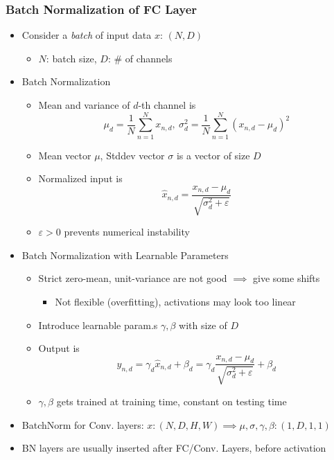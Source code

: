 \subsubsection*{Batch Normalization of FC Layer}
\begin{itemize}
    \item Consider a \textit{batch} of input data $x$: $(N,D)$
    \begin{itemize}
        \item $N$: batch size, $D$: \# of channels
    \end{itemize}
    \item Batch Normalization
    \begin{itemize}
        \item Mean and variance of $d$-th channel is
        \begin{equation}
            \mu_d=\frac{1}{N}\sum_{n=1}^Nx_{n,d},~\sigma_d^2=\frac{1}{N}\sum_{n=1}^N\left(x_{n,d}-\mu_d\right)^2
        \end{equation}
        \item Mean vector $\mu$, Stddev vector $\sigma$ is a vector of size $D$
        \item Normalized input is
        \begin{equation}
            \hat{x}_{n,d}=\frac{x_{n,d}-\mu_d}{\sqrt{\sigma_d^2+\varepsilon}}
        \end{equation}
        \item $\varepsilon>0$ prevents numerical instability
    \end{itemize}
    \item Batch Normalization with Learnable Parameters
    \begin{itemize}
        \item Strict zero-mean, unit-variance are not good $\implies$ give some shifts
        \begin{itemize}
            \item Not flexible (overfitting), activations may look too linear
        \end{itemize}
        \item Introduce learnable param.s $\gamma,\beta$ with size of $D$
        \item Output is
        \begin{equation}
            y_{n,d}=\gamma_d\hat{x}_{n,d}+\beta_d=\gamma_d\frac{x_{n,d}-\mu_d}{\sqrt{\sigma_d^2+\varepsilon}}+\beta_d
        \end{equation}
        \item $\gamma,\beta$ gets trained at training time, constant on testing time
    \end{itemize}
    \item BatchNorm for Conv. layers: $x:(N,D,H,W)\implies\mu,\sigma,\gamma,\beta:(1,D,1,1)$
    \item BN layers are usually inserted after FC/Conv. Layers, before activation
\end{itemize}

